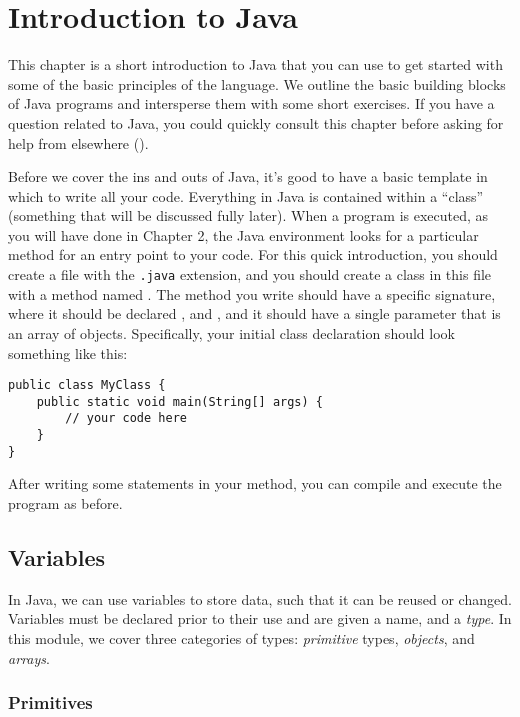 \clearpage
\section{Introduction to Java}

This chapter is a short introduction to Java that you can use to get started with some of the basic principles of the language. We outline the basic building blocks of Java programs and intersperse them with some short exercises. If you have a question related to Java, you could quickly consult this chapter before asking for help from elsewhere ().

Before we cover the ins and outs of Java, it's good to have a basic template in which to write all your code. Everything in Java is contained within a ``class'' (something that will be discussed fully later). When a program is executed, as you will have done in Chapter 2, the Java environment looks for a particular method for an entry point to your code. For this quick introduction, you should create a file with the \texttt{.java} extension, and you should create a class in this file with a method named . The  method you write should have a specific signature, where it should be declared ,  and , and it should have a single parameter that is an array of  objects. Specifically, your initial class declaration should look something like this:

\begin{verbatim}
public class MyClass {
    public static void main(String[] args) {
        // your code here
    }
}
\end{verbatim} 

After writing some statements in your  method, you can compile and execute the program as before.

\subsection{Variables}

In Java, we can use variables to store data, such that it can be reused or changed. Variables must be declared prior to their use and are given a name, and a \emph{type}. In this module, we cover three categories of types: \emph{primitive} types, \emph{objects}, and \emph{arrays}.

\subsubsection*{Primitives}

